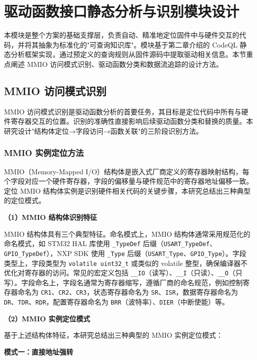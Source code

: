 \section{驱动函数接口静态分析与识别模块设计}
\label{sec:collector}

本模块是整个方案的基础支撑层，负责自动、精准地定位固件中与硬件交互的代码，并将其抽象为标准化的"可查询知识库"。模块基于第二章介绍的 CodeQL 静态分析框架实现，通过预定义的查询规则从固件源码中提取驱动相关信息。本节重点阐述 MMIO 访问模式识别、驱动函数分类和数据流追踪的设计方法。

\subsection{MMIO 访问模式识别}

MMIO 访问模式识别是驱动函数分析的首要任务，其目标是定位代码中所有与硬件寄存器交互的位置。识别的准确性直接影响后续驱动函数分类和替换的质量。本研究设计"结构体定位→字段访问→函数关联"的三阶段识别方法。

\subsubsection{MMIO 实例定位方法}

MMIO（Memory-Mapped I/O）结构体是嵌入式厂商定义的寄存器映射结构，每个字段对应一个硬件寄存器，字段的偏移量与硬件规范中的寄存器地址偏移一致。定位 MMIO 结构体实例是识别硬件相关代码的关键步骤，本研究总结出三种典型的定位模式。

\textbf{（1）MMIO 结构体识别特征}

MMIO 结构体具有三个典型特征。命名模式上，MMIO 结构体通常采用规范化的命名模式，如 STM32 HAL 库使用 \texttt{\_TypeDef} 后缀（\texttt{USART\_TypeDef}、\texttt{GPIO\_TypeDef}），NXP SDK 使用 \texttt{\_Type} 后缀（\texttt{USART\_Type}、\texttt{GPIO\_Type}）。字段类型上，字段类型为 \texttt{volatile uint32\_t} 或类似的 volatile 整型，确保编译器不优化对寄存器的访问。常见的宏定义包括 \texttt{\_\_IO}（读写）、\texttt{\_\_I}（只读）、\texttt{\_\_O}（只写）。字段命名上，字段名通常为寄存器缩写，遵循厂商的命名规范，例如控制寄存器命名为 \texttt{CR1}、\texttt{CR2}、\texttt{CR3}，状态寄存器命名为 \texttt{SR}、\texttt{ISR}，数据寄存器命名为 \texttt{DR}、\texttt{TDR}、\texttt{RDR}，配置寄存器命名为 \texttt{BRR}（波特率）、\texttt{DIER}（中断使能）等。

\textbf{（2）MMIO 实例定位模式}

基于上述结构体特征，本研究总结出三种典型的 MMIO 实例定位模式：

\textbf{模式一：直接地址强转}

